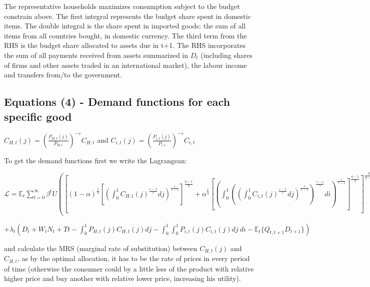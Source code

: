 \documentclass[
]{article}
\begin{document}
The representative households maximizes consumption subject to the
budget constrain above. The first integral represents the budget share
spent in domestic items. The double integral is the share spent in
imported goods: the sum of all items from all countries bought, in
domestic currency. The third term from the RHS is the budget share
allocated to assets due in t+1. The RHS incorporates the sum of all
payments received from assets summarized in \(D_t\) (including shares of
firms and other assets traded in an international market), the labour
income and transfers from/to the government.

\vspace{12pt}

\hypertarget{equations-4---demand-functions-for-each-specific-good}{%
\subsection{Equations (4) - Demand functions for each specific
good}\label{equations-4---demand-functions-for-each-specific-good}}

\(\displaystyle C_{H,t}(j)= \left( \frac{P_{H,t}(j)}{P_{H,t}}\right)^{-\varepsilon}C_{H,t}\)
and
\(\displaystyle C_{i,t}(j)= \left( \frac{P_{i,t}(j)}{P_{i,t}}\right)^{-\varepsilon}C_{i,t}\)

\vspace{8pt}

To get the demand functions first we write the Lagrangean:

\(\mathcal{L} = \displaystyle \mathbb{E}_t \sum_{t=0}^\infty \beta^t U \left(\left[ (1-\alpha)^{\frac{1}{\eta}} \left [\displaystyle \left( \int_0^1 C_{H,t}(j)^{\frac{\varepsilon-1}{\varepsilon}}dj \right) ^{\frac{\varepsilon}{\varepsilon-1}} \right]^{\frac{\eta-1}{\eta}} + \alpha^{\frac{1}{\eta}} \left[ \displaystyle \left( \int_0^1 \left( \displaystyle \left( \int_0^1 C_{i,t}(j)^{\frac{\varepsilon-1}{\varepsilon}}dj \right) ^{\frac{\varepsilon}{\varepsilon-1}} \right)^{\frac{\gamma-1}{\gamma}}di \right) ^{\frac{\gamma}{\gamma-1}} \right]^{\frac{\eta-1}{\eta}} \right]^{\frac{\eta}{\eta-1}},N_t \right)\)

\(+ \lambda_t \left(D_t + W_tN_t + Tt \displaystyle - \int_0^1 P_{H,t}(j)C_{H,t}(j)dj - \int_0^1\int_0^1 P_{i,t}(j)C_{i,t}(j)dj\ di - \mathbb{E}_t\{ Q_{t,t+1}D_{t+1}\}\right)\)

and calculate the MRS (marginal rate of substitution) between
\(C_{H,t}(j)\) and \(C_{H,t}\), as by the optimal allocation, it has to
be the rate of prices in every period of time (otherwise the consumer
could by a little less of the product with relative higher price and buy
another with relative lower price, increasing his utility).
\end{document}
